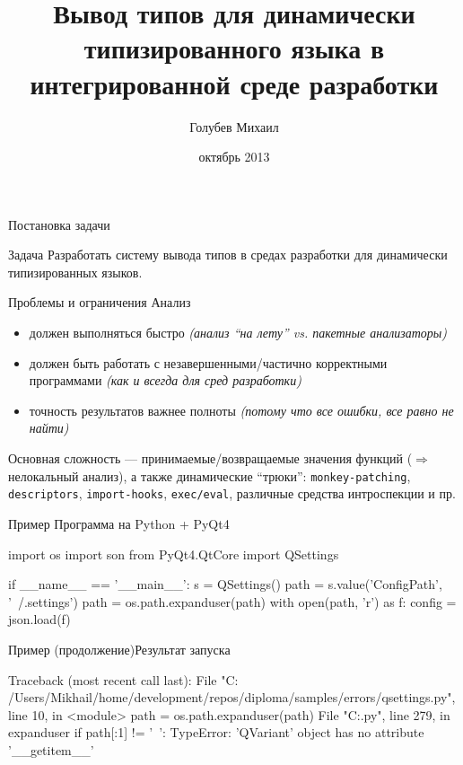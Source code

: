 \documentclass{beamer}
\title[Вывод типов]{Вывод типов для динамически типизированного языка в 
интегрированной среде разработки}
\author{Голубев Михаил}
\institute[ИИТУ]{
  Санкт-Петербургский государственный политехнический университет \\
  Институт информационных технологий и управления \\
  Кафедра компьютерных систем и программных технологий
}
\date{октябрь 2013}
\begin{document}
\begin{frame}
  \titlepage
\end{frame}


\begin{frame}{Постановка задачи}
  \begin{block}{Задача}
    Разработать систему вывода типов в средах разработки для динамически типизированных языков.
    \footnotemark[1]
  \end{block}
\end{frame}


\begin{frame}{Проблемы и ограничения}
  Анализ
  \begin{itemize}
    \item должен выполняться быстро \emph{(анализ “на лету” vs. пакетные анализаторы)}
    \item должен быть работать с незавершенными/частично корректными программами \emph{(как и всегда для сред разработки)}
    \item точность результатов важнее полноты \emph{(потому что все ошибки, все равно не найти)}
  \end{itemize}

  Основная сложность --- принимаемые/возвращаемые значения функций 
  ($\Rightarrow$ нелокальный анализ), а также динамические “трюки”: \texttt{monkey-patching}, 
  \texttt{descriptors}, \texttt{import-hooks}, \texttt{exec/eval}, различные средства интроспекции и пр.
\end{frame}


\begin{frame}[fragile]{Пример}
Программа на Python + PyQt4

\begin{pythoncode}
import os
import son
from PyQt4.QtCore import QSettings

if __name__ == '__main__':
    s = QSettings()
    path = s.value('ConfigPath', '~/.settings')
    path = os.path.expanduser(path)
    with open(path, 'r') as f:
        config = json.load(f)
\end{pythoncode}
\end{frame}


\begin{frame}[fragile]{Пример (продолжение)}{Результат запуска}
\begin{pythoncode}
Traceback (most recent call last):
File "C: /Users/Mikhail/home/development/repos/diploma/samples/errors/qsettings.py", line 10, in <module>
path = os.path.expanduser(path)
File "C:\lib\ntpath.py", line 279, in expanduser
if path[:1] != '~':
TypeError: 'QVariant' object has no attribute '__getitem__'
\end{pythoncode}
\end{frame}
\end{document}
